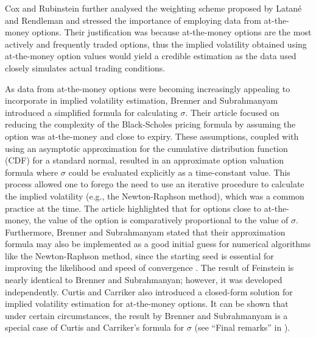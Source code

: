 Cox and Rubinstein \cite{Cox1985} further analysed the weighting scheme proposed by Latan\'e and Rendleman and stressed the importance of employing data from at-the-money options. Their justification was because at-the-money options are the most actively and frequently traded options, thus the implied volatility obtained using at-the-money option values would yield a credible estimation as the data used closely simulates actual trading conditions.

As data from at-the-money options were becoming increasingly appealing to incorporate in implied volatility estimation, Brenner and Subrahmanyam \cite{Brenner1988} introduced a simplified formula for calculating $\sigma$. Their article focused on reducing the complexity of the Black-Scholes pricing formula by assuming the option was at-the-money and close to expiry. These assumptions, coupled with using an asymptotic approximation for the cumulative distribution function (CDF) for a standard normal, resulted in an approximate option valuation formula where $\sigma$ could be evaluated explicitly as a time-constant value. This process allowed one to forego the need to use an iterative procedure to calculate the implied volatility (e.g., the Newton-Raphson method), which was a common practice at the time. The article highlighted that for options close to at-the-money, the value of the option is comparatively proportional to the value of $\sigma$. Furthermore, Brenner and Subrahmanyam stated that their approximation formula may also be implemented as a good initial guess for numerical algorithms like the Newton-Raphson method, since the starting seed is essential for improving the likelihood and speed of convergence \cite{Manaster1982}. The result of Feinstein \cite{Feinstein1988} is nearly identical to Brenner and Subrahmanyan; however, it was developed independently. Curtis and Carriker \cite{Curtis1988} also introduced a closed-form solution for implied volatility estimation for at-the-money options. It can be shown that under certain circumstances, the result by Brenner and Subrahmanyam is a special case of Curtis and Carriker's formula for $\sigma$ (see ``Final remarks'' in \cite{Chargoy2006}).

